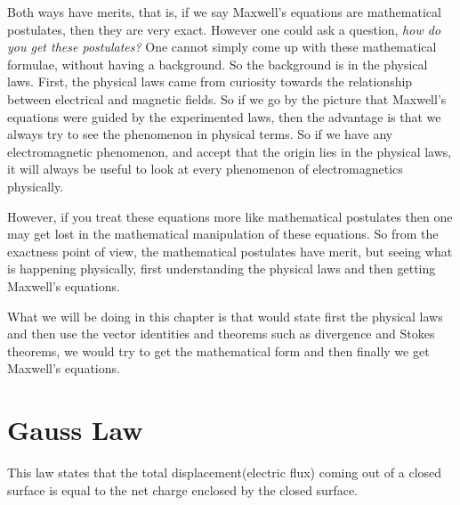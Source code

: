 Both ways have merits, that is, if we say Maxwell's equations are mathematical postulates, then they are very exact. However one could ask a question, \emph{how do you get these postulates?} One cannot simply come up with these mathematical formulae, without having a background. So the background is in the physical laws. First, the physical laws came from curiosity towards the relationship between electrical and magnetic fields. So if we go by the picture that Maxwell's equations were guided by the experimented laws, then the advantage is that we always try to see the phenomenon in physical terms. So if we have any electromagnetic phenomenon, and accept that the origin lies in the physical laws, it will always be useful to look at every phenomenon of electromagnetics physically.

However, if you treat these equations more like mathematical postulates then one may get lost in the mathematical manipulation of these equations. So from the exactness point of view, the mathematical postulates have merit, but seeing what is happening physically, first understanding the physical laws and then getting Maxwell's equations.

What we will be doing in this chapter is that would state first the physical laws and then use the vector identities and theorems such as divergence and Stokes theorems, we would try to get the mathematical form and then finally we get Maxwell's equations.

\section{Gauss Law}
This law states that the total displacement(electric flux) coming out of a closed surface is equal to the net charge enclosed by the closed surface.

